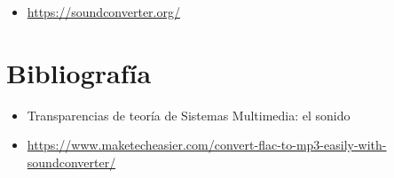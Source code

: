 \documentclass[11pt,a4paper]{article}
\begin{document}
\begin{itemize}
	\item \textcolor{blue}{\url{https://soundconverter.org/}}
\end{itemize}

\section{Bibliografía}

\begin{itemize}
	\item Transparencias de teoría de Sistemas Multimedia: el sonido
	\item \footnotesize{\textcolor{blue}{\url{https://www.maketecheasier.com/convert-flac-to-mp3-easily-with-soundconverter/}}}
\end{itemize}
\end{document}
